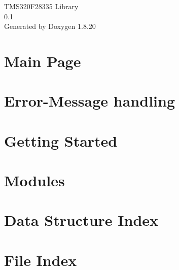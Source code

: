 \let\mypdfximage\pdfximage\def\pdfximage{\immediate\mypdfximage}\documentclass[twoside]{book}
\newcommand{\+}{\discretionary{\mbox{\scriptsize$\hookleftarrow$}}{}{}}
\newcommand{\clearemptydoublepage}{%
  \newpage{\pagestyle{empty}\cleardoublepage}%
}
\begin{document}
\hypersetup{pageanchor=false,
             bookmarksnumbered=true,
             pdfencoding=unicode
            }
\begin{titlepage}
\vspace*{7cm}
\begin{center}%
{\Large T\+M\+S320\+F28335 Library \\[1ex]\large 0.\+1 }\\
\vspace*{1cm}
{\large Generated by Doxygen 1.8.20}\\
\end{center}
\end{titlepage}
\clearemptydoublepage
{}
\tableofcontents
\clearemptydoublepage
{}
\hypersetup{pageanchor=true}

\chapter{Main Page}
\label{index}\hypertarget{index}{}
\chapter{Error-\/\+Message handling}
\label{_error_section}

\chapter{Getting Started}
\label{_getting_started_section}

\chapter{Modules}
\label{_module_section}

\chapter{Data Structure Index}

\chapter{File Index}

\end{document}
